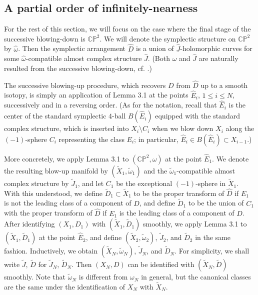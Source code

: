 \documentclass[11pt]{amsart}
\theoremstyle{plain}
\numberwithin{theorem}{section}
\theoremstyle{definition}
\newcommand{\C}{{\mathbb C}}
\renewcommand{\P}{{\mathbb P}}
\begin{document}
\subsection{A partial order of infinitely-nearness} 
For the rest of this section, we will focus on the case where the final stage of the 
successive blowing-down is $\C\P^2$. We will denote the symplectic structure on $\C\P^2$ by $\hat{\omega}$.
Then the symplectic arrangement $\hat{D}$ is a union of $\hat{J}$-holomorphic curves for some 
$\hat{\omega}$-compatible almost complex structure $\hat{J}$. (Both $\hat{\omega}$
and $\hat{J}$ are naturally resulted from the successive blowing-down, cf. \cite{C1}.)

The successive blowing-up procedure, which recovers $D$ from $\hat{D}$ up to a smooth isotopy,  
is simply an application of Lemma 3.1 at the points $\hat{E}_i$, $1\leq i\leq N$, successively and 
in a reversing order. (As for the notation, recall that $\hat{E}_i$ is the center of the standard symplectic $4$-ball $B(\hat{E}_i)$ equipped with the standard complex structure, which is inserted into $X_i\setminus C_i$ when we blow down $X_i$ along the $(-1)$-sphere $C_i$ representing the class $E_i$; in particular, 
$\hat{E}_i\in B(\hat{E}_i)\subset X_{i-1}$.)

More concretely, we apply Lemma 3.1 to $(\C\P^2,\hat{\omega})$ at the point
$\hat{E}_1$. We denote the resulting blow-up manifold by $(\tilde{X}_1,\tilde{\omega}_1)$ and the
$\tilde{\omega}_1$-compatible almost complex structure by $\tilde{J}_1$, and let $C_1$ be the
exceptional $(-1)$-sphere in $\tilde{X}_1$. With this understood, we define $\tilde{D}_1\subset 
\tilde{X}_1$ to be the proper transform of $\hat{D}$ if $E_1$ is not the leading class of a component of $D$, and define $\tilde{D}_1$ to be the union of $C_1$ with the proper transform 
of $\hat{D}$ if $E_1$ is the leading class of a component of $D$. After identifying $(X_1,D_1)$ with
$(\tilde{X}_1,\tilde{D}_1)$ smoothly, we apply Lemma 3.1 to $(\tilde{X}_1,\tilde{D}_1)$ at the point
$\hat{E}_2$, and define $(\tilde{X}_2,\tilde{\omega}_2)$, $\tilde{J}_2$, and $\tilde{D}_2$ in the same fashion. Inductively, we obtain $(\tilde{X}_N,\tilde{\omega}_N)$, $\tilde{J}_N$, and $\tilde{D}_N$.
For simplicity, we shall write $\tilde{J}$, $\tilde{D}$ for $\tilde{J}_N$, $\tilde{D}_N$. Then 
$(X_N,D)$ can be identified with $(\tilde{X}_N,\tilde{D})$ smoothly. Note that $\tilde{\omega}_N$ is different from $\omega_N$ in general, but the canonical classes are the same under the identification of $X_N$ with $\tilde{X}_N$.
\end{document}
